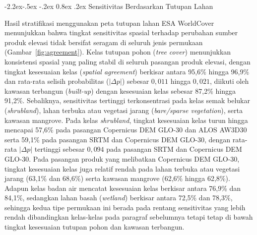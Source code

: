 \documentclass[12pt,a4paper]{article}
\makeatletter
\renewcommand\subsection{\@startsection{subsection}{2}{\z@}%
  {-2.2ex\@plus -.5ex \@minus -.2ex}%
  {0.8ex \@plus .2ex}%
  {\normalfont\normalsize\bfseries}}
\makeatother
\begin{document}
\subsection{Sensitivitas Berdasarkan Tutupan Lahan}

Hasil stratifikasi menggunakan peta tutupan lahan ESA WorldCover menunjukkan
bahwa tingkat sensitivitas spasial terhadap perubahan sumber produk elevasi
tidak bersifat seragam di seluruh jenis permukaan (Gambar~\ref{fig:agreement}).
Kelas tutupan
pohon (\textit{tree cover}) menunjukkan konsistensi spasial yang paling stabil
di seluruh pasangan produk elevasi, dengan tingkat kesesuaian kelas
(\textit{spatial agreement}) berkisar antara 95,6\% hingga 96,9\% dan
rata-rata selisih probabilitas ($|\Delta p|$) sebesar $0{,}011$ hingga
$0{,}021$, diikuti oleh kawasan terbangun (\textit{built-up}) dengan
kesesuaian kelas sebesar 87,2\% hingga 91,2\%. Sebaliknya, sensitivitas
tertinggi terkonsentrasi pada kelas semak belukar (\textit{shrubland}), lahan
terbuka atau vegetasi jarang (\textit{bare/sparse vegetation}), serta kawasan
mangrove. Pada kelas \textit{shrubland}, tingkat kesesuaian kelas turun hingga
mencapai 57,6\% pada pasangan Copernicus DEM GLO-30 dan ALOS AW3D30 serta
59,1\% pada pasangan SRTM dan Copernicus DEM GLO-30, dengan rata-rata
$|\Delta p|$ tertinggi sebesar $0{,}094$ pada pasangan SRTM dan Copernicus DEM
GLO-30. Pada pasangan produk yang melibatkan Copernicus DEM GLO-30, tingkat
kesesuaian kelas juga relatif rendah pada lahan terbuka atau vegetasi jarang
(63,1\% dan 68,6\%) serta kawasan mangrove (62,6\% hingga 62,8\%). Adapun
kelas badan air mencatat kesesuaian kelas berkisar antara 76,9\% dan 84,1\%,
sedangkan lahan basah (\textit{wetland}) berkisar antara 72,5\% dan 78,3\%,
sehingga kedua tipe permukaan ini berada pada rentang sensitivitas yang
lebih rendah dibandingkan kelas-kelas pada paragraf sebelumnya tetapi tetap
di bawah tingkat kesesuaian tutupan pohon dan kawasan terbangun.
\end{document}
